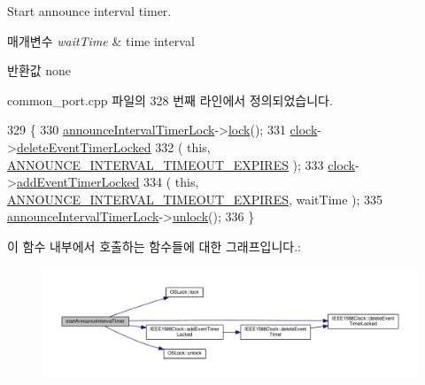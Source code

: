 Start announce interval timer. 


\begin{DoxyParams}{매개변수}
{\em wait\+Time} & time interval \\
\hline
\end{DoxyParams}
\begin{DoxyReturn}{반환값}
none 
\end{DoxyReturn}


common\+\_\+port.\+cpp 파일의 328 번째 라인에서 정의되었습니다.


\begin{DoxyCode}
329 \{
330     \hyperlink{class_common_port_a652fe375b2664ee0bedbc5c31a3556df}{announceIntervalTimerLock}->\hyperlink{class_o_s_lock_a9186992157d223030a002f3aded7aba2}{lock}();
331     \hyperlink{class_common_port_aa2bc8731fa5aeb5b033feebc2b67258c}{clock}->\hyperlink{class_i_e_e_e1588_clock_ab3079a65b0509eeb40c2828fa6a7834a}{deleteEventTimerLocked}
332         ( \textcolor{keyword}{this}, \hyperlink{ieee1588_8hpp_a5667b805d857c6d28f83f6038a0272d3acd9bfe0c66373bb54c37784519f53d3a}{ANNOUNCE\_INTERVAL\_TIMEOUT\_EXPIRES} );
333     \hyperlink{class_common_port_aa2bc8731fa5aeb5b033feebc2b67258c}{clock}->\hyperlink{class_i_e_e_e1588_clock_a4747f09108bd78ecd68d58dad4358d77}{addEventTimerLocked}
334         ( \textcolor{keyword}{this}, \hyperlink{ieee1588_8hpp_a5667b805d857c6d28f83f6038a0272d3acd9bfe0c66373bb54c37784519f53d3a}{ANNOUNCE\_INTERVAL\_TIMEOUT\_EXPIRES}, waitTime );
335     \hyperlink{class_common_port_a652fe375b2664ee0bedbc5c31a3556df}{announceIntervalTimerLock}->\hyperlink{class_o_s_lock_a5b965df44250112cac3cf967dc998bec}{unlock}();
336 \}
\end{DoxyCode}


이 함수 내부에서 호출하는 함수들에 대한 그래프입니다.\+:
\nopagebreak
\begin{figure}[H]
\begin{center}
\leavevmode
\includegraphics[width=350pt]{class_common_port_a3938df4f200087f96727e90805c543c9_cgraph}
\end{center}
\end{figure}




